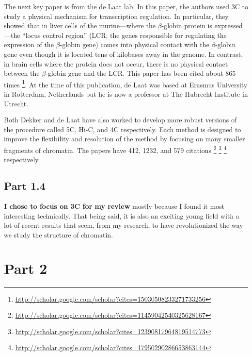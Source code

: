 \documentclass[12pt]{article}
\begin{document}
The next key paper \cite{looping} is from the de Laat lab.
In this paper, the authors used 3C to study a physical mechanism for
transcription regulation.
In particular, they showed that in liver cells of the murine---where the
$\beta$-globin protein is expressed---the ``locus control region'' (LCR; the
genes responsible for regulating the expression of the $\beta$-globin gene)
comes into physical contact with the $\beta$-globin gene even though it is
located tens of kilobases away in the genome.
In contrast, in brain cells where the protein does not occur, there is no
physical contact between the $\beta$-globin gene and the LCR.
This paper has been cited about 865 times%
\footnote{\url{http://scholar.google.com/scholar?cites=15030508233271733256}}.
At the time of this publication, de Laat was based at Erasmus University in
Rotterdam, Netherlands but he is now a professor at The Hubrecht Institute in
Utrecht.

Both Dekker \cite{5c, hi-c} and de Laat \cite{4c} have also worked to develop
more robust versions of the procedure called 5C, Hi-C, and 4C respectively.
Each method is designed to improve the flexibility and resolution of the
method by focusing on many smaller fragments of chromatin.
The papers have 412, 1232, and 579 citations%
\footnote{\url{http://scholar.google.com/scholar?cites=11459042540325628167}}%
\footnote{\url{http://scholar.google.com/scholar?cites=12390817964819514773}}%
\footnote{\url{http://scholar.google.com/scholar?cites=17950290286653863144}}
respectively.

\subsection*{Part 1.4}

{\bf I chose to focus on 3C for my review} mostly because I found it most
interesting technically.
That being said, it is also an exciting young field with a lot of recent
results that seem, from my research, to have revolutionized the way we study
the structure of chromatin.

\newpage

\section*{Part 2}
\end{document}
